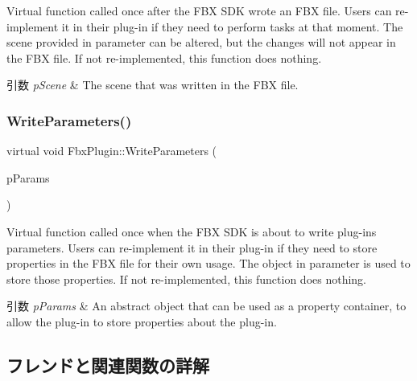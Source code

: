 Virtual function called once after the F\+BX S\+DK wrote an F\+BX file. Users can re-\/implement it in their plug-\/in if they need to perform tasks at that moment. The scene provided in parameter can be altered, but the changes will not appear in the F\+BX file. If not re-\/implemented, this function does nothing. 
\begin{DoxyParams}{引数}
{\em p\+Scene} & The scene that was written in the F\+BX file. \\
\hline
\end{DoxyParams}
\mbox{\label{class_fbx_plugin_af4b6ae438302c2153d582f1d6c87b636}} 
\subsubsection{\texorpdfstring{Write\+Parameters()}{WriteParameters()}}
{\footnotesize\ttfamily virtual void Fbx\+Plugin\+::\+Write\+Parameters (\begin{DoxyParamCaption}\item[{\hyperlink{class_fbx_object}{Fbx\+Object} \&}]{p\+Params }\end{DoxyParamCaption})\hspace{0.3cm}{\ttfamily [virtual]}}

Virtual function called once when the F\+BX S\+DK is about to write plug-\/in\textquotesingle{}s parameters. Users can re-\/implement it in their plug-\/in if they need to store properties in the F\+BX file for their own usage. The object in parameter is used to store those properties. If not re-\/implemented, this function does nothing. 
\begin{DoxyParams}{引数}
{\em p\+Params} & An abstract object that can be used as a property container, to allow the plug-\/in to store properties about the plug-\/in. \\
\hline
\end{DoxyParams}


\subsection{フレンドと関連関数の詳解}
\mbox{\label{class_fbx_plugin_a0e95beb1c4d5b2d326640c0ec8e9fbed}} 
